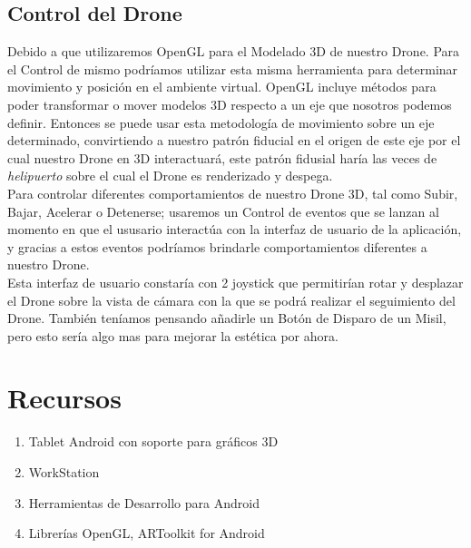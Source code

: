 \documentclass[a4paper]{article}
\begin{document}
\subsection{Control del Drone}
Debido a que utilizaremos OpenGL para el Modelado 3D de nuestro Drone. Para el Control de mismo podríamos utilizar esta misma herramienta para determinar movimiento y posición en el ambiente virtual. OpenGL incluye métodos para poder transformar o mover modelos 3D respecto a un eje que nosotros podemos definir. Entonces se puede usar esta metodología de movimiento sobre un eje determinado, convirtiendo a nuestro patrón fiducial en el origen de este eje por el cual nuestro Drone en 3D interactuará, este patrón fidusial haría las veces de \textit{helipuerto} sobre el cual el Drone es renderizado y despega.\\
Para controlar diferentes comportamientos de nuestro Drone 3D, tal como Subir, Bajar, Acelerar o Detenerse; usaremos un Control de eventos que se lanzan al momento en que el ususario interactúa con la interfaz de usuario de la aplicación, y gracias a estos eventos podríamos brindarle comportamientos diferentes a nuestro Drone.\\
Esta interfaz de usuario constaría con 2 joystick que permitirían rotar y desplazar el Drone sobre la vista de cámara con la que se podrá realizar el seguimiento del Drone. También teníamos pensando añadirle un Botón de Disparo de un Misil, pero esto sería algo mas para mejorar la estética por ahora.

\section{Recursos}
\begin{enumerate}
  \item Tablet Android con soporte para gráficos 3D
  \item WorkStation
  \item Herramientas de Desarrollo para Android
  \item Librerías OpenGL, ARToolkit for Android
\end{enumerate}




%

\end{document}
